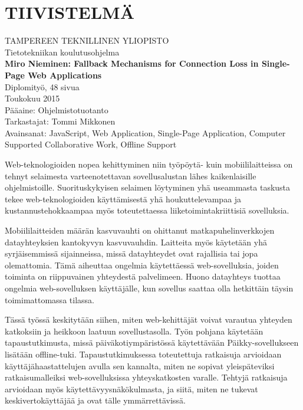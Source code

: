 \newpage
 
\setcounter{page}{1} %
 
\chapter*{TIIVISTELMÄ}
\begin{spacing}{1.0}
\textsf{TAMPEREEN TEKNILLINEN YLIOPISTO}\\
\textsf{Tietotekniikan koulutusohjelma}\\
{\bf \textsf{Miro Nieminen: Fallback Mechanisms for Connection Loss in Single-Page Web Applications}}\\
\textsf{Diplomityö, 48 sivua}\\
\textsf{Toukokuu 2015}\\
\textsf{Pääaine: Ohjelmistotuotanto}\\
\textsf{Tarkastajat: Tommi Mikkonen}\\
\textsf{Avainsanat: JavaScript, Web Application, Single-Page Application, Computer Supported Collaborative Work, Offline Support}\\
\end{spacing}
 
Web-teknologioiden nopea kehittyminen niin työpöytä- kuin mobiililaitteissa on tehnyt selaimesta varteenotettavan sovellusalustan lähes kaikenlaisille ohjelmistoille. Suorituskykyisen selaimen löytyminen yhä useammasta taskusta tekee web-tek\-no\-lo\-gi\-oi\-den käyttämisestä yhä houkuttelevampaa ja kustannustehokkaampaa myös toteutettaessa liiketoimintakriittisiä sovelluksia.

Mobiililaitteiden määrän kasvuvauhti on ohittanut matkapuhelinverkkojen datayhteyksien kan\-to\-ky\-vyn kasvuvauhdin. Laitteita myös käytetään yhä syrjäisemmissä sijainneissa, missä datayhteydet ovat rajallisia tai jopa olemattomia. Tämä aiheuttaa ongelmia käytettäessä web-sovelluksia, joiden toiminta on riippuvainen yhteydestä palvelimeen. Huono datayhteys tuottaa ongelmia web-sovelluksen käyttäjälle, kun sovellus saattaa olla hetkittäin täysin toimimattomassa tilassa.

Tässä työssä keskitytään siihen, miten web-kehittäjät voivat varautua yhteyden katkoksiin ja heikkoon laatuun sovellustasolla. Työn pohjana käytetään tapaustutkimusta, missä päiväkotiympäristössä käytettävään Päikky-sovellukseen lisätään offline-tuki. Tapaustutkimuksessa toteutettuja ratkaisuja arvioidaan käyttäjähaastattelujen avulla sen kannalta, miten ne sopivat yleispäteviksi ratkaisumalleiksi web-sovelluksissa yhteyskatkosten varalle. Tehtyjä ratkaisuja arvioidaan myös käytettävyysnäkökulmasta, ja siitä, miten ne tukevat keskivertokäyttäjää ja ovat tälle ymmärrettävissä.

